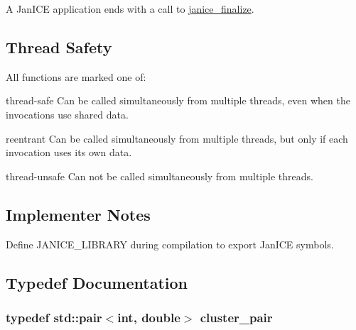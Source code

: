 A Jan\+I\+C\+E application ends with a call to \hyperlink{group__janice_ga3a2f0366f897c1168639b152b2cdf554}{janice\+\_\+finalize}.\hypertarget{group__janice_thread_safety}{}\subsection{Thread Safety}\label{group__janice_thread_safety}
All functions are marked one of\+:
\begin{DoxyItemize}
\item \label{group__janice_thread_safe}%
\hypertarget{group__janice_thread_safe}{}%
\begin{DoxyParagraph}{thread-\/safe}
Can be called simultaneously from multiple threads, even when the invocations use shared data.
\end{DoxyParagraph}

\item \label{group__janice_reentrant}%
\hypertarget{group__janice_reentrant}{}%
\begin{DoxyParagraph}{reentrant}
Can be called simultaneously from multiple threads, but only if each invocation uses its own data.
\end{DoxyParagraph}

\item \label{group__janice_thread_unsafe}%
\hypertarget{group__janice_thread_unsafe}{}%
\begin{DoxyParagraph}{thread-\/unsafe}
Can not be called simultaneously from multiple threads.
\end{DoxyParagraph}

\end{DoxyItemize}\hypertarget{group__janice_implementer_notes}{}\subsection{Implementer Notes}\label{group__janice_implementer_notes}
Define {\ttfamily J\+A\+N\+I\+C\+E\+\_\+\+L\+I\+B\+R\+A\+R\+Y} during compilation to export Jan\+I\+C\+E symbols. 

\subsection{Typedef Documentation}
\hypertarget{group__janice_ga469e8635dece2be63e8871ed3e2b2f4c}{}
\subsubsection[{cluster\+\_\+pair}]{\setlength{\rightskip}{0pt plus 5cm}typedef std\+::pair$<$int, double$>$ {\bf cluster\+\_\+pair}}\label{group__janice_ga469e8635dece2be63e8871ed3e2b2f4c}


